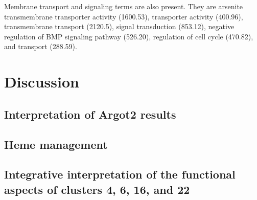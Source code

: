 Membrane transport and signaling terms are also present.
%
They are arsenite transmembrane transporter activity (1600.53), transporter activity (400.96), transmembrane transport (2120.5), signal transduction (853.12), negative regulation of BMP signaling pathway (526.20), regulation of cell cycle (470.82), and transport (288.59).








\section{Discussion} \label{chap:4-sec:discussion}



\subsection{Interpretation of Argot2 results} %
\lipsum[1]

\subsection{Heme management}
\lipsum[1]

\subsection{Integrative interpretation of the functional aspects of clusters 4, 6, 16, and 22} %
\lipsum[1-3]


